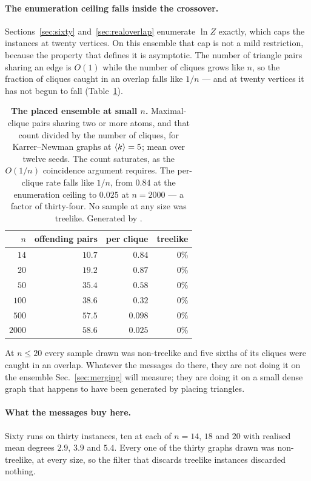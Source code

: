 \paragraph{The enumeration ceiling falls inside the crossover.}
Sections~\ref{sec:sixty} and~\ref{sec:realoverlap} enumerate $\ln Z$ exactly,
which caps the instances at twenty vertices. On this ensemble that cap is not a
mild restriction, because the property that defines it is asymptotic. The number
of triangle pairs sharing an edge is $O(1)$ while the number of cliques grows
like $n$, so the fraction of cliques caught in an overlap falls like $1/n$ ---
and at twenty vertices it has not begun to fall (Table~\ref{tab:knfinite}).

\begin{table}[t]
\centering\small
\begin{tabular}{rrrr}
\hline\hline
$n$ & offending pairs & per clique & treelike\\
\hline
$14$ & $10.7$ & $0.84$ & $0$\%\\
$20$ & $19.2$ & $0.87$ & $0$\%\\
$50$ & $35.4$ & $0.58$ & $0$\%\\
$100$ & $38.6$ & $0.32$ & $0$\%\\
$500$ & $57.5$ & $0.098$ & $0$\%\\
$2000$ & $58.6$ & $0.025$ & $0$\%\\
\hline\hline
\end{tabular}
\caption{\textbf{The placed ensemble at small $n$.} Maximal-clique pairs sharing
two or more atoms, and that count divided by the number of cliques, for
Karrer--Newman graphs at $\langle k \rangle=5$; mean over twelve seeds. The count
saturates, as the $O(1/n)$ coincidence argument requires. The per-clique rate
falls like $1/n$, from $0.84$ at the enumeration ceiling to $0.025$ at
$n=2000$ --- a factor of thirty-four. No sample at any size was treelike.
Generated by .}
\label{tab:knfinite}
\end{table}

At $n\le20$ every sample drawn was non-treelike and five sixths of its cliques
were caught in an overlap. Whatever the messages do there, they are not doing it
on the ensemble Sec.~\ref{sec:merging} will measure; they are doing it on a
small dense graph that happens to have been generated by placing triangles.

\paragraph{What the messages buy here.} Sixty runs on thirty instances, ten at
each of $n=14$, $18$ and $20$ with realised mean degrees $2.9$, $3.9$ and $5.4$.
Every one of the thirty graphs drawn was non-treelike, at every size, so the
filter that discards treelike instances discarded nothing.


